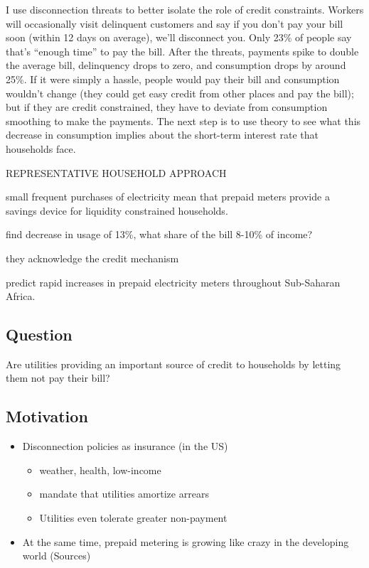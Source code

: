 \documentclass[12pt]{article}
\begin{document}
I use disconnection threats to better isolate the role of credit constraints.  Workers will occasionally visit delinquent customers and say if you don't pay your bill soon (within 12 days on average), we'll disconnect you.  Only 23\% of people say that's ``enough time'' to pay the bill.  After the threats, payments spike to double the average bill, delinquency drops to zero, and consumption drops by around 25\%.  If it were simply a hassle, people would pay their bill and consumption wouldn't change (they could get easy credit from other places and pay the bill); but if they are credit constrained, they have to deviate from consumption smoothing to make the payments.  The next step is to use theory to see what this decrease in consumption implies about the short-term interest rate that households face.


REPRESENTATIVE HOUSEHOLD APPROACH

\cite{jack2015pay} small frequent purchases of electricity mean that prepaid meters provide a savings device for liquidity constrained households.  


\cite{jack2016charging} find decrease in usage of 13\%, what share of the bill 8-10\% of income?

  they acknowledge the credit mechanism


\cite{northeast2014} predict rapid increases in prepaid electricity meters throughout Sub-Saharan Africa.  


\subsection{Question} 
Are utilities providing an important source of credit to households by letting them not pay their bill?

\subsection{Motivation}
\begin{itemize}
\item Disconnection policies as insurance (in the US) 
	\begin{itemize}
		\item weather, health, low-income
		\item mandate that utilities amortize arrears
		\item Utilities even tolerate greater non-payment
	\end{itemize}
\item At the same time, prepaid metering is growing like crazy in the developing world (Sources)
\end{itemize}
\end{document}

